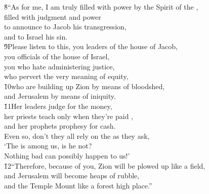 \begin{poetry}
\poeml \v{8}``As for me, I am truly filled with power by the Spirit of the , \\
\poemll    filled with judgment and power \\
\poeml to announce to Jacob his transgression, \\
\poemll    and to Israel his sin. \\
\poeml \v{9}Please listen to this, you leaders of the house of Jacob, \\
\poemll    you officials of the house of Israel, \\
\poeml you who hate administering justice, \\
\poemll    who pervert the very meaning of equity, \\
\poeml \v{10}who are building up Zion by means of bloodshed, \\
\poemll    and Jerusalem by means of iniquity. \\
\poeml \v{11}Her leaders judge for the money, \\
\poemll    her priests teach only when they're paid , \\
\poemlll       and her prophets prophesy for cash. \\
\poeml Even so, don't they all rely on the  as they ask, \\
\poemll    `The  is among us, is he not? \\
\poemlll       Nothing bad can possibly happen to us!' \\
\poeml \v{12}``Therefore, because of you, Zion will be plowed up like a field, \\
\poemll    and Jerusalem will become heaps of rubble, \\
\poemlll       and the Temple Mount like a forest high place.''
\end{poetry}


